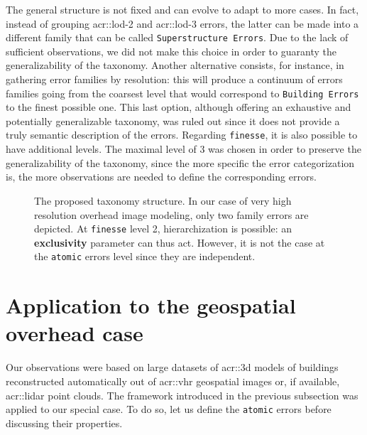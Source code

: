         The general structure is not fixed and can evolve to adapt to more cases.
        In fact, instead of grouping \gls{acr::lod}-2 and \gls{acr::lod}-3 errors, the latter can be made into a different family that can be called \texttt{Superstructure Errors}.
        Due to the lack of sufficient observations, we did not make this choice in order to guaranty the generalizability of the taxonomy.
        Another alternative consists, for instance, in gathering error families by resolution: this will produce a continuum of errors families going from the coarsest level that would correspond to \texttt{Building Errors} to the finest possible one.
        This last option, although offering an exhaustive and potentially generalizable taxonomy, was ruled out since it does not provide a truly semantic description of the errors.
        Regarding \texttt{finesse}, it is also possible to have additional levels.
        The maximal level of 3 was chosen in order to preserve the generalizability of the taxonomy, since the more specific the error categorization is, the more observations are needed to define the corresponding errors.

        \begin{figure}[htbp]
            \begin{center}
                
                \caption{
                    \label{fig::taxonomy} 
                    The proposed taxonomy structure.
                    In our case of very high resolution overhead image modeling, only two family errors are depicted.
                    At \texttt{finesse} level 2, hierarchization is possible: an \textbf{exclusivity} parameter can thus act.
                    However, it is not the case at the \texttt{atomic} errors level since they are independent.
                }
            \end{center}
        \end{figure}

\section{Application to the geospatial overhead case}
    \label{sec::semantic_evaluation::overhead}
    Our observations were based on large datasets of \gls{acr::3d} models of buildings reconstructed automatically out of \gls{acr::vhr} geospatial images or, if available, \gls{acr::lidar} point clouds.
    The framework introduced in the previous subsection was applied to our special case.
    To do so, let us define the \texttt{atomic} errors before discussing their properties.

